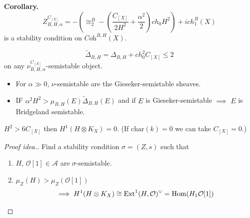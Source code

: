 \medskip\noindent
{\bf Corollary.}
$$
Z_{B,H,\alpha}^{C_{[X]}}=-\left(\cong_2^B-
\left(\frac{C_{[X]}}{2H^2}+\frac{\alpha^2}{2}
\right)ch_0H^2\right)
+ich_1^B(X)
$$
is a stability condition on
$\textit{Coh}^{B,H}(X)$.

\begin{remark}
\label{remark-inequality}
$$
\tilde{\Delta}_{B,H}=\Delta_{B,H}+
ch_0^2C_{[X]
}\leq
2
$$
on any
$\nu_{B,H,\alpha}^{C_{[X]}}$-semistable
object.
\end{remark}

\begin{lemma}
\label{lemma-low-key-lemma}
\begin{itemize}
\item For $\alpha\gg 0$, $\nu$-semistable are
the Gieseker-semistable sheaves.
\item IF
$\alpha^2H^2>\mu_{B,H}(E)\tilde{\Delta}_{B,H}
(E)$
and if $E$ is
Gieseker-semistable $\implies$ $E$ is
Bridgeland semistable.
\end{itemize}
\end{lemma}

\begin{theorem}
\label{theorem-vanishing}
$H^2>6 C_{[X]}$ then $H^1(H \otimes K_X)=0$.
(If $\text{char}(k)=0$ we can take
$C_{[X]}=0$.)
\end{theorem}

\begin{proof}[Proof idea.]
Find a stability condition $\sigma=(Z,s)$
such that
\begin{enumerate}
\item $H$,  $\mathcal{O}[1] \in \mathcal{A}$
are $\sigma$-semistable.
\item $\mu_Z(H)>\mu_Z(\mathcal{O}[1])$
$$
\implies H^{1}(H \otimes K_X) \cong
\text{Ext}^1(H,\mathcal{O})^\vee
= \mathop{\mathrm{Hom}}\nolimits(H_1\mathcal{O}[1])
$$
\end{enumerate}
\end{proof}

